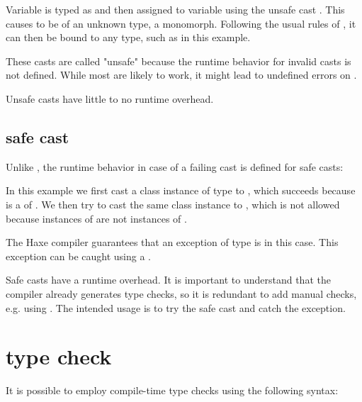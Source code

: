 
Variable  is typed as  and then assigned to variable  using the unsafe cast . This causes  to be of an unknown type, a monomorph. Following the usual rules of , it can then be bound to any type, such as  in this example.

These casts are called "unsafe" because the runtime behavior for invalid casts is not defined. While most  are likely to work, it might lead to undefined errors on .

Unsafe casts have little to no runtime overhead.

\subsection{safe cast}
\label{expression-cast-safe}

Unlike , the runtime behavior in case of a failing cast is defined for safe casts:


In this example we first cast a class instance of type  to , which succeeds because  is a  of . We then try to cast the same class instance to , which is not allowed because instances of  are not instances of .

The Haxe compiler guarantees that an exception of type  is  in this case. This exception can be caught using a .

Safe casts have a runtime overhead. It is important to understand that the compiler already generates type checks, so it is redundant to add manual checks, e.g. using . The intended usage is to try the safe cast and catch the  exception.


\section{type check}
\label{expression-type-check}

It is possible to employ compile-time type checks using the following syntax:

